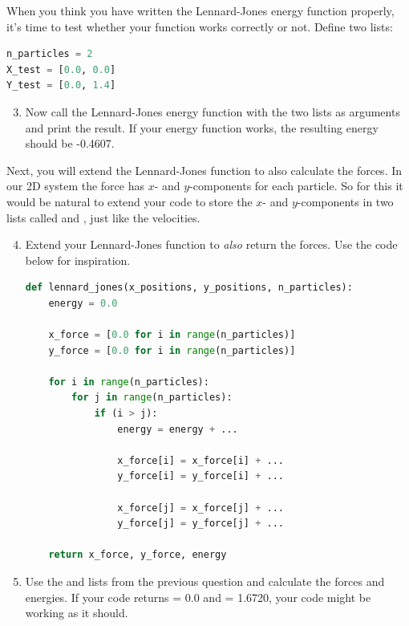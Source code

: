 \documentclass{article}
\begin{document}
When you think you have written the Lennard-Jones energy function properly,
it's time to test whether your function works correctly or not.
Define two lists:

\begin{lstlisting}[language=python]
n_particles = 2
X_test = [0.0, 0.0]
Y_test = [0.0, 1.4]
\end{lstlisting}


\begin{enumerate}
    \setcounter{enumi}{2}

    \item Now call the Lennard-Jones energy function with the two lists as
        arguments and print the result. If your energy function works, the
        resulting energy should be -0.4607.

\end{enumerate}

Next, you will extend the Lennard-Jones function to also calculate
the forces. In our 2D system the force has $x$- and $y$-components for each
particle.
So for this it would be natural to extend your code to store the $x$- and
$y$-components in two lists called  and , just
like the velocities.

\begin{enumerate}
    \setcounter{enumi}{3}

    \item Extend your Lennard-Jones function to \textit{also} return the forces.
        Use the code below for inspiration.

\begin{lstlisting}[language=python]
def lennard_jones(x_positions, y_positions, n_particles):
    energy = 0.0

    x_force = [0.0 for i in range(n_particles)]
    y_force = [0.0 for i in range(n_particles)]

    for i in range(n_particles):
        for j in range(n_particles):
            if (i > j):
                energy = energy + ...

                x_force[i] = x_force[i] + ...
                y_force[i] = y_force[i] + ...

                x_force[j] = x_force[j] + ...
                y_force[j] = y_force[j] + ...

    return x_force, y_force, energy

\end{lstlisting}

    \item Use the  and  lists from the previous question and
        calculate the forces and energies.
        If your code returns  = 0.0 and  = 1.6720, your
        code might be working as it should.

\end{enumerate}
\end{document}
